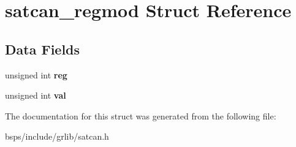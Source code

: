 \hypertarget{structsatcan__regmod}{}\section{satcan\+\_\+regmod Struct Reference}
\label{structsatcan__regmod}
\subsection*{Data Fields}
\begin{DoxyCompactItemize}
\item 
\mbox{\label{structsatcan__regmod_a1eebfe93e8df2f883b823d6a01b1d59a}} 
unsigned int {\bfseries reg}
\item 
\mbox{\label{structsatcan__regmod_a7422491c85bb589b87112992f7901cc7}} 
unsigned int {\bfseries val}
\end{DoxyCompactItemize}


The documentation for this struct was generated from the following file\+:\begin{DoxyCompactItemize}
\item 
bsps/include/grlib/satcan.\+h\end{DoxyCompactItemize}
